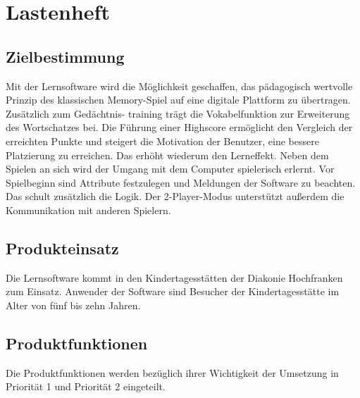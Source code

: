 \clearpage
\chapter{Lastenheft}

\section{Zielbestimmung} %
Mit der Lernsoftware wird die Möglichkeit geschaffen, das pädagogisch wertvolle Prinzip des klassischen Memory-Spiel auf eine digitale Plattform zu übertragen. Zusätzlich zum Gedächtnis- training trägt die Vokabelfunktion zur Erweiterung des Wortschatzes bei. Die Führung einer Highscore ermöglicht den Vergleich der erreichten Punkte und steigert die Motivation der Benutzer, eine bessere Platzierung zu erreichen. Das erhöht wiederum den Lerneffekt. Neben dem Spielen an sich wird der Umgang mit dem Computer spielerisch erlernt. Vor Spielbeginn sind Attribute festzulegen und Meldungen der Software zu beachten. Das schult zusätzlich die Logik. Der 2-Player-Modus unterstützt außerdem die Kommunikation mit anderen Spielern.


\section{Produkteinsatz} %
Die Lernsoftware kommt in den Kindertagesstätten der Diakonie Hochfranken zum Einsatz. Anwender der Software sind Besucher der Kindertagesstätte im Alter von fünf bis zehn Jahren.

\section{Produktfunktionen} %
Die Produktfunktionen werden bezüglich ihrer Wichtigkeit der Umsetzung in Priorität 1 und Priorität 2 eingeteilt.\\

